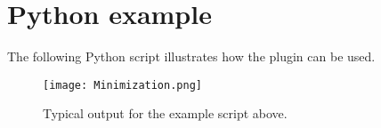 \section{Python example}
The following Python script illustrates how the plugin can be used.

\begin{singlespace}

\end{singlespace}

\begin{figure}[ht]
\centering
\texttt{[image: Minimization.png]}
\caption{Typical output for the example script above.}
\label{fig:lmfitFig}
\end{figure}






